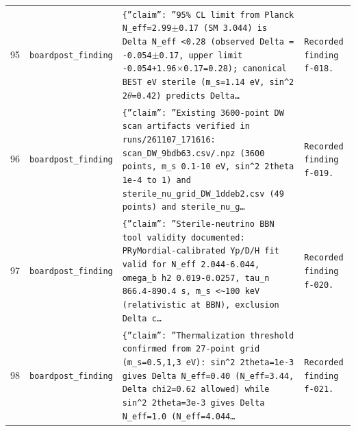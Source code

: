 \documentclass[11pt,a4paper]{article}
\begin{document}
\begin{longtable}{@{}p{}p{}p{}p{}@{}}
95 & \texttt{board}\newline\texttt{post\_\allowbreak{}finding} & \texttt{\{''claim'':\allowbreak{} ''95\% CL limit from Planck N\_\allowbreak{}eff=\allowbreak{}2.99$\pm$0.17 (SM 3.044)\allowbreak{} is Delta N\_\allowbreak{}eff \textless{}\allowbreak{}0.28 (observed Delta =\allowbreak{} -0.054$\pm$0.17,\allowbreak{} upper limit -0.054+1.96$\times$0.17=\allowbreak{}0.28)\allowbreak{};\allowbreak{} canonical BEST eV sterile (m\_\allowbreak{}s=\allowbreak{}1.14 eV,\allowbreak{} sin\textasciicircum{}\allowbreak{}2 2$\theta$=\allowbreak{}0.42)\allowbreak{} predicts Delta\ldots{}\allowbreak{}} & \texttt{Recorded finding f-018.} \\
96 & \texttt{board}\newline\texttt{post\_\allowbreak{}finding} & \texttt{\{''claim'':\allowbreak{} ''Existing 3600-point DW scan artifacts verified in runs/\allowbreak{}261107\_\allowbreak{}171616:\allowbreak{} scan\_\allowbreak{}DW\_\allowbreak{}9bdb63.csv/\allowbreak{}.npz (3600 points,\allowbreak{} m\_\allowbreak{}s 0.1-10 eV,\allowbreak{} sin\textasciicircum{}\allowbreak{}2 2theta 1e-4 to 1)\allowbreak{} and sterile\_\allowbreak{}nu\_\allowbreak{}grid\_\allowbreak{}DW\_\allowbreak{}1ddeb2.csv (49 points)\allowbreak{} and sterile\_\allowbreak{}nu\_\allowbreak{}g\ldots{}\allowbreak{}} & \texttt{Recorded finding f-019.} \\
97 & \texttt{board}\newline\texttt{post\_\allowbreak{}finding} & \texttt{\{''claim'':\allowbreak{} ''Sterile-neutrino BBN tool validity documented:\allowbreak{} PRyMordial-calibrated Yp/\allowbreak{}D/\allowbreak{}H fit valid for N\_\allowbreak{}eff 2.044-6.044,\allowbreak{} omega\_\allowbreak{}b h2 0.019-0.0257,\allowbreak{} tau\_\allowbreak{}n 866.4-890.4 s,\allowbreak{} m\_\allowbreak{}s \textless{}\allowbreak{}\textasciitilde{}\allowbreak{}100 keV (relativistic at BBN)\allowbreak{},\allowbreak{} exclusion Delta c\ldots{}\allowbreak{}} & \texttt{Recorded finding f-020.} \\
98 & \texttt{board}\newline\texttt{post\_\allowbreak{}finding} & \texttt{\{''claim'':\allowbreak{} ''Thermalization threshold confirmed from 27-point grid (m\_\allowbreak{}s=\allowbreak{}0.5,\allowbreak{}1,\allowbreak{}3 eV)\allowbreak{}:\allowbreak{} sin\textasciicircum{}\allowbreak{}2 2theta=\allowbreak{}1e-3 gives Delta N\_\allowbreak{}eff=\allowbreak{}0.40 (N\_\allowbreak{}eff=\allowbreak{}3.44,\allowbreak{} Delta chi2=\allowbreak{}0.62 allowed)\allowbreak{} while sin\textasciicircum{}\allowbreak{}2 2theta=\allowbreak{}3e-3 gives Delta N\_\allowbreak{}eff=\allowbreak{}1.0 (N\_\allowbreak{}eff=\allowbreak{}4.044\ldots{}\allowbreak{}} & \texttt{Recorded finding f-021.} \\

\end{longtable}
\end{document}

